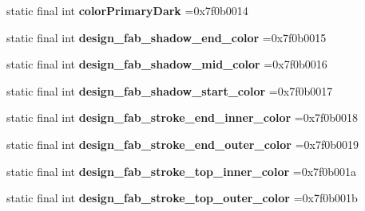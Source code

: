 \begin{DoxyCompactItemize}
\item 
\hypertarget{classcheck_1_1test_1_1_r_1_1color_aa03d01d8d728d4d4f2385d900bcdc6aa}{}static final int {\bfseries color\+Primary\+Dark} =0x7f0b0014\label{classcheck_1_1test_1_1_r_1_1color_aa03d01d8d728d4d4f2385d900bcdc6aa}

\item 
\hypertarget{classcheck_1_1test_1_1_r_1_1color_a5f6294e03e81db31e21832837099f9ae}{}static final int {\bfseries design\+\_\+fab\+\_\+shadow\+\_\+end\+\_\+color} =0x7f0b0015\label{classcheck_1_1test_1_1_r_1_1color_a5f6294e03e81db31e21832837099f9ae}

\item 
\hypertarget{classcheck_1_1test_1_1_r_1_1color_a5cbb4fbfb0f3364d5c286849e5e0bf94}{}static final int {\bfseries design\+\_\+fab\+\_\+shadow\+\_\+mid\+\_\+color} =0x7f0b0016\label{classcheck_1_1test_1_1_r_1_1color_a5cbb4fbfb0f3364d5c286849e5e0bf94}

\item 
\hypertarget{classcheck_1_1test_1_1_r_1_1color_a32893bf5b6d58f3b2616685f09d1bc25}{}static final int {\bfseries design\+\_\+fab\+\_\+shadow\+\_\+start\+\_\+color} =0x7f0b0017\label{classcheck_1_1test_1_1_r_1_1color_a32893bf5b6d58f3b2616685f09d1bc25}

\item 
\hypertarget{classcheck_1_1test_1_1_r_1_1color_ae089f66ccb4b9e8a86b05f41fc95a5c1}{}static final int {\bfseries design\+\_\+fab\+\_\+stroke\+\_\+end\+\_\+inner\+\_\+color} =0x7f0b0018\label{classcheck_1_1test_1_1_r_1_1color_ae089f66ccb4b9e8a86b05f41fc95a5c1}

\item 
\hypertarget{classcheck_1_1test_1_1_r_1_1color_a9945d09b22c661203e4b5b124511e929}{}static final int {\bfseries design\+\_\+fab\+\_\+stroke\+\_\+end\+\_\+outer\+\_\+color} =0x7f0b0019\label{classcheck_1_1test_1_1_r_1_1color_a9945d09b22c661203e4b5b124511e929}

\item 
\hypertarget{classcheck_1_1test_1_1_r_1_1color_a1f67788a6c4f56986224eb5e56a82a8b}{}static final int {\bfseries design\+\_\+fab\+\_\+stroke\+\_\+top\+\_\+inner\+\_\+color} =0x7f0b001a\label{classcheck_1_1test_1_1_r_1_1color_a1f67788a6c4f56986224eb5e56a82a8b}

\item 
\hypertarget{classcheck_1_1test_1_1_r_1_1color_a75a4f6f5030dcad239944b48b4cbc3ae}{}static final int {\bfseries design\+\_\+fab\+\_\+stroke\+\_\+top\+\_\+outer\+\_\+color} =0x7f0b001b\label{classcheck_1_1test_1_1_r_1_1color_a75a4f6f5030dcad239944b48b4cbc3ae}


\end{DoxyCompactItemize}

